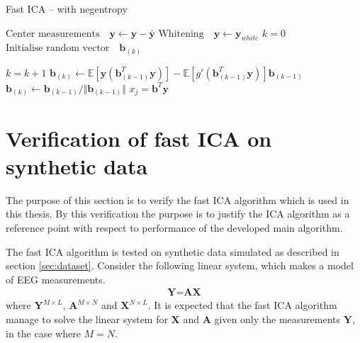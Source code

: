 \begin{algorithm}[H]
\caption{Fast ICA -- with negentropy }
\begin{algorithmic}[1]
			\State $\text{Center measurements} \quad \textbf{y} \gets \textbf{y} - \bar{\textbf{y}}$
			\State $\text{Whitening} \quad \textbf{y}\gets \textbf{y}_{white}$ 
			\EndProcedure  
			\State
			\State$k=0$            
            \State$\text{Initialise random vector} \quad \textbf{b}_{(k)}$ 
            
               		\State $k = k+1$
                	\State $\textbf{b}_{(k)} \gets \mathbb{E}[ \textbf{y}(\textbf{b}_{(k-1)}^T \textbf{y})] - \mathbb{E}[g'(\textbf{b}_{(k-1)}^T \textbf{y})] \textbf{b}_{(k-1)}$  
                	\State $\textbf{b}_{(k)} \gets \textbf{b}_{(k-1)}/\Vert \textbf{b}_{(k-1)} \Vert $ 
          		\EndWhile
          		\State $x_{j} = \textbf{b}^T\textbf{y}$
          	\EndFor
          	
            \EndProcedure
        \end{algorithmic} 
        \label{alg:fastICA}
\end{algorithm}


\section{Verification of fast ICA on synthetic data}\label{app:ica_test}
The purpose of this section is to verify the fast ICA algorithm which is used in this thesis. By this verification the purpose is to justify the ICA algorithm as a reference point with respect to performance of the developed main algorithm.

The fast ICA algorithm is tested on synthetic data simulated as described in section \ref{sec:dataset}. 
Consider the following linear system, which makes a model of EEG measurements.  
\begin{align*}
\textbf{Y}=\textbf{AX}
\end{align*}
where $\textbf{Y}^{M\times L}$, $\textbf{A}^{M\times N}$ and $\textbf{X}^{N\times L}$. It is expected that the fast ICA algorithm manage to solve the linear system for $\textbf{X}$ and $\textbf{A}$ given only the measurements $\textbf{Y}$, in the case where $M=N$.  

